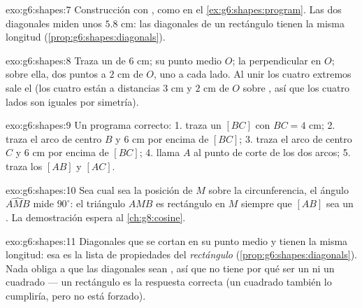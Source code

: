 \begin{solution}{exo:g6:shapes:7}
Construcción con , como en el \cref{ex:g6:shapes:program}.
Las dos diagonales miden unos $5.8$ cm: las diagonales de un rectángulo
tienen la misma longitud (\cref{prop:g6:shapes:diagonals}).
\end{solution}

\begin{solution}{exo:g6:shapes:8}
Traza un  de $6$ cm; su punto medio $O$; la perpendicular en $O$;
sobre ella, dos puntos a $2$ cm de $O$, uno a cada lado. Al unir los cuatro
extremos sale el  (los cuatro  están a distancias
$3$ cm y $2$ cm de $O$ sobre , así que los cuatro lados
son iguales por simetría).
\end{solution}

\begin{solution}{exo:g6:shapes:9}
Un programa correcto:
1. traza un  $[BC]$ con $BC = 4$ cm;
2. traza el arco de centro $B$ y  $6$ cm por encima de $[BC]$;
3. traza el arco de centro $C$ y  $6$ cm por encima de $[BC]$;
4. llama $A$ al punto de corte de los dos arcos;
5. traza los  $[AB]$ y $[AC]$.
\end{solution}

\begin{solution}{exo:g6:shapes:10}
Sea cual sea la posición de $M$ sobre la circunferencia, el ángulo $\widehat{AMB}$
mide $90^\circ$: el triángulo $AMB$ es rectángulo en $M$
siempre que $[AB]$ sea un . La demostración espera al
\cref{ch:g8:cosine}.
\end{solution}

\begin{solution}{exo:g6:shapes:11}
Diagonales que se cortan en su punto medio y tienen la misma longitud:
esa es la lista de propiedades del \emph{rectángulo}
(\cref{prop:g6:shapes:diagonals}). Nada obliga a que las diagonales sean
, así que no tiene por qué ser un  ni un cuadrado --- un rectángulo
es la respuesta correcta (un cuadrado también lo cumpliría, pero no está
forzado).
\end{solution}

